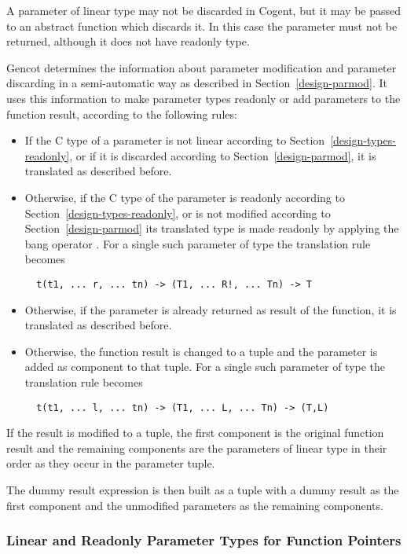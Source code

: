 A parameter of linear type may not be discarded in Cogent, but it may be passed to an abstract function which discards
it. In this case the parameter must not be returned, although it does not have readonly type.

Gencot determines the information about parameter modification and parameter discarding in a semi-automatic way
as described in Section~\ref{design-parmod}. It uses this information to make parameter types readonly or
add parameters to the function result, according to the following rules:
\begin{itemize}
\item If the C type of a parameter is not linear according to Section~\ref{design-types-readonly}, or if it
is discarded according to Section~\ref{design-parmod}, it is translated as described before.
\item Otherwise, if the C type of the parameter is readonly according to Section~\ref{design-types-readonly}, or
is not modified according to Section~\ref{design-parmod} its translated type is made readonly by applying the
bang operator \code{!}. For a single such parameter of type  the translation rule becomes
\begin{verbatim}
  t(t1, ... r, ... tn) -> (T1, ... R!, ... Tn) -> T
\end{verbatim}
\item Otherwise, if the parameter is already returned as result of the function, it is translated as described before.
\item Otherwise, the function result is changed to a tuple and the parameter is added as component to that tuple.
For a single such parameter of type  the translation rule becomes
\begin{verbatim}
  t(t1, ... l, ... tn) -> (T1, ... L, ... Tn) -> (T,L)
\end{verbatim}
\end{itemize}

If the result is modified to a tuple, the first component is the original function result and the remaining components
are the parameters of linear type in their order as they occur in the parameter tuple.

The dummy result expression is then built as a tuple with a dummy result as the first component and the unmodified
parameters as the remaining components.

\subsubsection{Linear and Readonly Parameter Types for Function Pointers}


